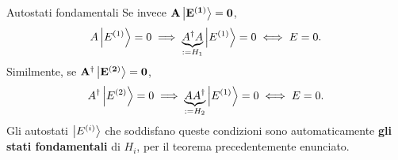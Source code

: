 \documentclass[11pt,aspectratio=169,handout]{beamer}
\begin{document}
\begin{frame}{Autostati fondamentali}
    Se invece $\mathbf{A\ket{E^{(1)}}=0}$,
    \[
        A\ket{E^{(1)}}=0\implies \underbrace{A^\dagger A}_{:=H_1}\ket{E^{(1)}}=0
        \iff E=0.
    \]
    Similmente, se $\mathbf{A^\dagger \ket{E^{(2)}}=0}$,
    \[
        A^\dagger\ket{E^{(2)}}=0\implies \underbrace{AA^\dagger }_{:=H_2}
        \ket{E^{(1)}}=0 \iff E=0.
    \]
    Gli autostati $\ket{E^{(i)}}$ che soddisfano queste condizioni sono
    automaticamente \textbf{gli stati fondamentali} di $H_i$,
    per il teorema precedentemente enunciato. 
\end{frame}
\end{document}
